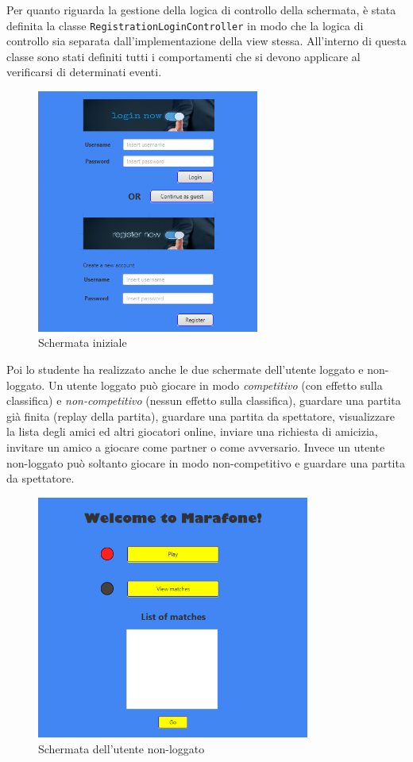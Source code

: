 Per quanto riguarda la gestione della logica di controllo della schermata, è stata definita la classe \texttt{RegistrationLoginController} in modo che la logica di controllo sia separata dall’implementazione della view stessa. All’interno di questa classe sono stati definiti tutti i comportamenti che si devono applicare al verificarsi di determinati eventi.

\begin{figure}[h!]
 \centering
  \includegraphics[width=0.65\textwidth]{login.png}
   \caption{Schermata iniziale}
\end{figure}

Poi lo studente ha realizzato anche le due schermate dell’utente loggato e non-loggato. Un utente loggato può giocare in modo \textit{competitivo} (con effetto sulla classifica) e \textit{non-competitivo} (nessun effetto sulla classifica), guardare una partita già finita (replay della partita), guardare una partita da spettatore, visualizzare la lista degli amici ed altri giocatori online, inviare una richiesta di amicizia, invitare un amico a giocare come partner o come avversario. Invece un utente non-loggato può soltanto giocare in modo non-competitivo e guardare una partita da spettatore.

\begin{figure}[h!]
 \centering
  \includegraphics[width=0.8\textwidth]{generic.png}
   \caption{Schermata dell'utente non-loggato }
\end{figure}

